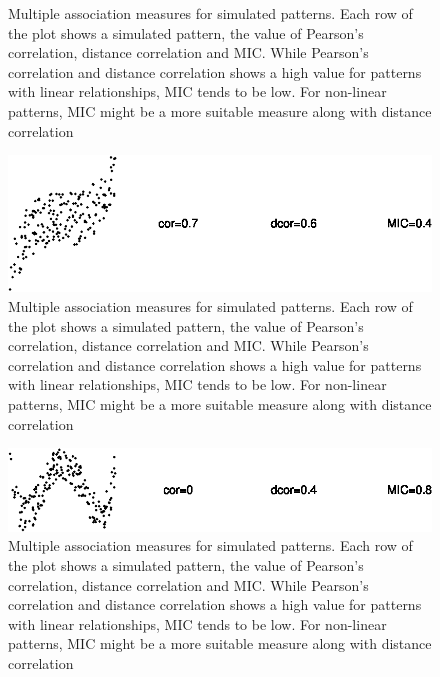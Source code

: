 \begin{Schunk}
\begin{figure}
{}

\caption[Multiple association measures for simulated patterns]{Multiple association measures for simulated patterns. Each row of the plot shows a simulated pattern, the value of Pearson's correlation, distance correlation and MIC. While Pearson's correlation and distance correlation shows a high value for patterns with linear relationships, MIC tends to be low. For non-linear patterns, MIC might be a more suitable measure along with distance correlation}\label{fig:motivation1-3}
\end{figure}
\begin{figure}

{\centering \includegraphics{rj_paper_files/figure-latex/motivation1-4} 

}

\caption[Multiple association measures for simulated patterns]{Multiple association measures for simulated patterns. Each row of the plot shows a simulated pattern, the value of Pearson's correlation, distance correlation and MIC. While Pearson's correlation and distance correlation shows a high value for patterns with linear relationships, MIC tends to be low. For non-linear patterns, MIC might be a more suitable measure along with distance correlation}\label{fig:motivation1-4}
\end{figure}
\begin{figure}

{\centering \includegraphics{rj_paper_files/figure-latex/motivation1-5} 

}

\caption[Multiple association measures for simulated patterns]{Multiple association measures for simulated patterns. Each row of the plot shows a simulated pattern, the value of Pearson's correlation, distance correlation and MIC. While Pearson's correlation and distance correlation shows a high value for patterns with linear relationships, MIC tends to be low. For non-linear patterns, MIC might be a more suitable measure along with distance correlation}\label{fig:motivation1-5}
\end{figure}
\begin{figure}


\end{figure}
\end{Schunk}
